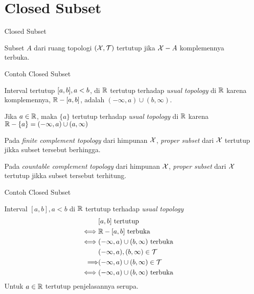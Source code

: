 \section*{Closed Subset}
\begin{frame}{Closed Subset}
    \begin{tcolorbox}[enhanced,title=Definisi, frame style tile={width=\paperwidth}{\wallpaper}]
        Subset $A$ dari ruang topologi $(\mathcal{X}, \mathcal{T})$ tertutup jika $\mathcal{X} - A$ komplemennya terbuka.
    \end{tcolorbox}
\end{frame}

\begin{frame}{Contoh Closed Subset}
    \begin{tcolorbox}[enhanced,title=Contoh 38, frame style tile={width=\paperwidth}{\wallpaper}]
        Interval tertutup $[a,b], a < b$, di $\mathbb{R}$ tertutup terhadap \textit{usual topology}
        di $\mathbb{R}$ karena komplemennya, $\mathbb{R}-[a,b]$, adalah $(-\infty, a) \cup (b,\infty)$.

        Jika $a \in \mathbb{R}$, maka $\{a\}$ tertutup terhadap \textit{usual topology} di $\mathbb{R}$ karena 
        $\mathbb{R} - \{a\}=(-\infty,a) \cup (a,\infty)$

        Pada \textit{finite complement topology} dari himpunan $\mathcal{X}$, \textit{proper subset} dari
        $\mathcal{X}$ tertutup jikka subset tersebut berhingga.

        Pada \textit{countable complement topology} dari himpunan $\mathcal{X}$, \textit{proper subset} dari
        $\mathcal{X}$ tertutup jikka subset tersebut terhitung.
    \end{tcolorbox}
\end{frame}

\begin{frame}{Contoh Closed Subset}
    \begin{tcolorbox}[enhanced,title=Contoh 38 (Penjelasan), frame style tile={width=\paperwidth}{\wallpaper}]
        Interval $[a,b],a<b$ di $\mathbb{R}$ tertutup terhadap \textit{usual topology}
        \begin{align*}
            &[a,b] \text{ tertutup}\\
            \iff &\mathbb{R} - [a,b] \text{ terbuka}\\
            \iff &(-\infty, a) \cup (b,\infty) \text{ terbuka}\\
            &(-\infty, a),(b,\infty)\in \mathcal{T}\\
            \Longrightarrow& (-\infty, a) \cup (b,\infty) \in \mathcal{T}\\
            \iff&(-\infty, a) \cup (b,\infty) \text{ terbuka}\\
        \end{align*}
        Untuk $a\in \mathbb{R}$ tertutup penjelasannya serupa.
    \end{tcolorbox}
\end{frame}

